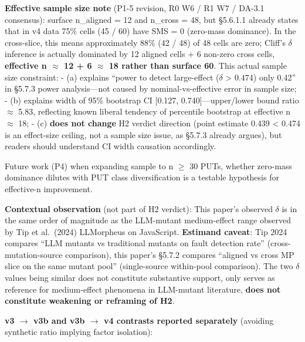 \documentclass[review,12pt,authoryear]{elsarticle}
\begin{document}
\textbf{Effective sample size note} (P1-5 revision, R0 W6 / R1 W7 /
DA-3.1 consensus): surface n\_aligned = 12 and n\_cross = 48, but
§5.6.1.1 already states that in v4 data 75\% cells (45 / 60) have SMS =
0 (zero-mass dominance). In the cross-slice, this means approximately
88\% (42 / 48) of 48 cells are zero; Cliff's $\delta$ inference is actually
dominated by 12 aligned cells + 6 non-zero cross cells,
\textbf{effective n $\approx$ 12 + 6 $\approx$ 18 rather than surface 60}. This actual
sample size constraint: - (a) explains ``power to detect large-effect ($\delta$
\textgreater{} 0.474) only 0.42'' in §5.7.3 power analysis---not caused
by nominal-vs-effective error in sample size; - (b) explains width of
95\% bootstrap CI {[}0.127, 0.740{]}---upper/lower bound ratio $\approx$ 5.83,
reflecting known liberal tendency of percentile bootstrap at effective n
$\approx$ 18; - (c) \textbf{does not change} H2 verdict direction (point
estimate 0.439 \textless{} 0.474 is an effect-size ceiling, not a sample
size issue, as §5.7.3 already argues), but readers should understand CI
width causation accordingly.

Future work (P4) when expanding sample to n $\geq$ 30 PUTs, whether zero-mass
dominance dilutes with PUT class diversification is a testable
hypothesis for effective-n improvement.

\textbf{Contextual observation} (not part of H2 verdict): This paper's
observed $\delta$ is in the same order of magnitude as the LLM-mutant
medium-effect range observed by Tip et al.~(2024) LLMorpheus on
JavaScript. \textbf{Estimand caveat}: Tip 2024 compares ``LLM mutants vs
traditional mutants on fault detection rate'' (cross-mutation-source
comparison), this paper's §5.7.2 compares ``aligned vs cross MP slice on
the same mutant pool'' (single-source within-pool comparison). The two $\delta$
values being similar does not constitute substantive support, only
serves as reference for medium-effect phenomena in LLM-mutant
literature, \textbf{does not constitute weakening or reframing of H2}.

\textbf{v3 $\to$ v3b and v3b $\to$ v4 contrasts reported separately} (avoiding
synthetic ratio implying factor isolation):
\end{document}

